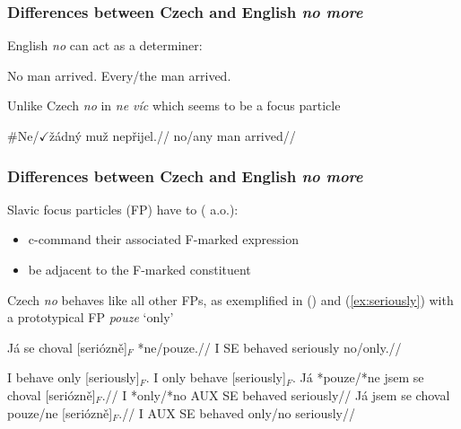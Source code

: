 \documentclass[10pt
]{beamer}
\begin{document}
\begin{frame}
  \frametitle{Differences between Czech and English \textit{no more}}

English \textit{no} can act as a determiner:

\pex \a No man arrived.
\a Every/the man arrived.
\xe

Unlike Czech \textit{no} in \textit{ne víc} which seems to be a focus particle

\ex \begingl
\gla \#Ne/$\checkmark$žádný muž nepřijel.//
\glb no/any man arrived//
\endgl
\xe

\end{frame}

\begin{frame}
  \frametitle{Differences between Czech and English \textit{no more}}

  Slavic focus particles (FP) have to (\cite{jasinskaja_information_2012} a.o.):
  
  \begin{itemize}
    \item c-command their associated F-marked expression
    \item be adjacent to the F-marked constituent
   
  \end{itemize}

\end{frame}

\begin{frame}

  Czech \textit{no} behaves like all other FPs, as exemplified in (\nextx) and (\ref{ex:seriously}) with a prototypical FP \emph{pouze} `only'
    

  \ex 
  \begingl
  \gla Já se choval {[}seriózně{]}\(_F\) *ne/pouze.//
  \glb I SE behaved seriously no/only.//
  \endgl
  \xe

  \pex\label{ex:seriously} \a I behave only {[}seriously{]}\(_F\). 
  \a I only behave {[}seriously{]}\(_F\). 
  \a
  \begingl
  \gla Já *pouze/*ne jsem se choval {[}seriózně{]}\(_F\).//
  \glb I *only/*no AUX SE behaved seriously//
  \endgl
  \a
  \begingl 
  \gla  Já jsem se choval pouze/ne {[}seriózně{]}\(_F\).//
  \glb I AUX SE behaved only/no seriously//
  \endgl
  \xe

\end{frame}
\end{document}
